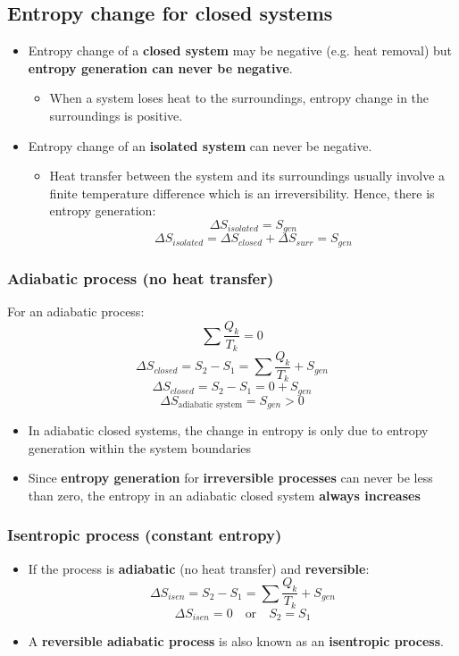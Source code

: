 \documentclass[11pt]{article}
\begin{document}
\subsection{Entropy change for closed systems}
\label{sec:org223e5ce}
\begin{itemize}
\item Entropy change of a \textbf{closed system} may be negative (e.g. heat removal) but \textbf{entropy generation can never be negative}.
\begin{itemize}
\item When a system loses heat to the surroundings, entropy change in the surroundings is positive.
\end{itemize}
\item Entropy change of an \textbf{isolated system} can never be negative.
\begin{itemize}
\item Heat transfer between the system and its surroundings usually involve a finite temperature difference which is an irreversibility. Hence, there is entropy generation:
\[\Delta S_{isolated} = S_{gen}\]
\[\Delta S_{isolated} = \Delta S_{closed} + \Delta S_{surr} = S_{gen}\]
\end{itemize}
\end{itemize}

\subsubsection{Adiabatic process (no heat transfer)}
\label{sec:org9d859eb}
For an adiabatic process:
\[\sum \frac{Q_k}{T_k} = 0\]
\[\Delta S_{closed} = S_2 - S_1 = \sum \frac{Q_k}{T_k} + S_{gen}\]
\[\Delta S_{closed} = S_2 - S_1 = 0 + S_{gen}\]
\[\Delta S_{\text{adiabatic system}} = S_{gen} > 0\]

\begin{itemize}
\item In adiabatic closed systems, the change in entropy is only due to entropy generation within the system boundaries
\item Since \textbf{entropy generation} for \textbf{irreversible processes} can never be less than zero, the entropy in an adiabatic closed system \textbf{always increases}
\end{itemize}

\subsubsection{Isentropic process (constant entropy)}
\label{sec:org7ce4d04}
\begin{itemize}
\item If the process is \textbf{adiabatic} (no heat transfer) and \textbf{reversible}:
\[\Delta S_{isen} = S_2 - S_1 = \sum \frac{Q_k}{T_k} + S_{gen}\]
\[\Delta S_{isen} = 0 \quad \text{or} \quad S_2 = S_1\]
\item A \textbf{reversible adiabatic process} is also known as an \textbf{isentropic process}.
\end{itemize}
\end{document}
